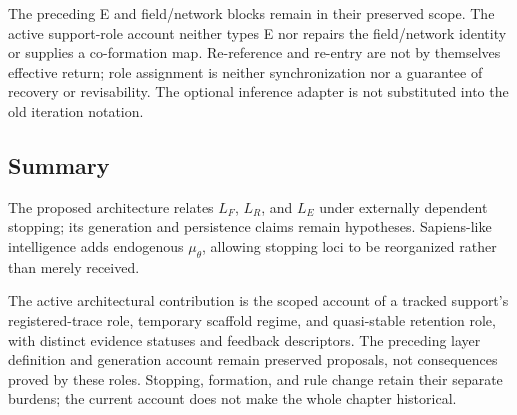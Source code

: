 The preceding E and field/network blocks remain in their preserved scope. The active support-role account neither types E nor repairs the field/network identity or supplies a co-formation map. Re-reference and re-entry are not by themselves effective return; role assignment is neither synchronization nor a guarantee of recovery or revisability. The optional inference adapter is not substituted into the old iteration notation.

\subsection{Summary}

The proposed architecture relates $L_F$, $L_R$, and $L_E$ under externally dependent stopping; its generation and persistence claims remain hypotheses. Sapiens-like intelligence adds endogenous $\mu_\theta$, allowing stopping loci to be reorganized rather than merely received.

The active architectural contribution is the scoped account of a tracked support's registered-trace role, temporary scaffold regime, and quasi-stable retention role, with distinct evidence statuses and feedback descriptors. The preceding layer definition and generation account remain preserved proposals, not consequences proved by these roles. Stopping, formation, and rule change retain their separate burdens; the current account does not make the whole chapter historical.

\bigskip
